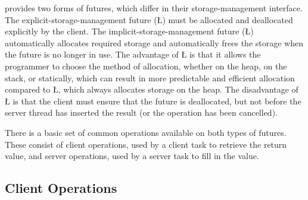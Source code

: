 \documentclass[openright,twoside]{report}
\begin{document}
\uC provides two forms of futures, which differ in their storage-management interface.
The explicit-storage-management future (\LGinlinetrue\LGbegin\lgrinde\L{}\endlgrinde\LGend{}) must be allocated and deallocated explicitly by the client.
The implicit-storage-management future (\LGinlinetrue\LGbegin\lgrinde\L{}\endlgrinde\LGend{}) automatically allocates required storage and automatically frees the storage when the future is no longer in use.
The advantage of \LGinlinetrue\LGbegin\lgrinde\L{}\endlgrinde\LGend{} is that it allows the programmer to choose the method of allocation, whether on the heap, on the stack, or statically, which can result in more predictable and efficient allocation compared to \LGinlinetrue\LGbegin\lgrinde\L{}\endlgrinde\LGend{}, which always allocates storage on the heap.
The disadvantage of \LGinlinetrue\LGbegin\lgrinde\L{}\endlgrinde\LGend{} is that the client must ensure that the future is deallocated, but not before the server thread has inserted the result (or the operation has been cancelled).

There is a basic set of common operations available on both types of futures.
These consist of client operations, used by a client task to retrieve the return value, and server operations, used by a server task to fill in the value.


\subsection{Client Operations}
\end{document}
